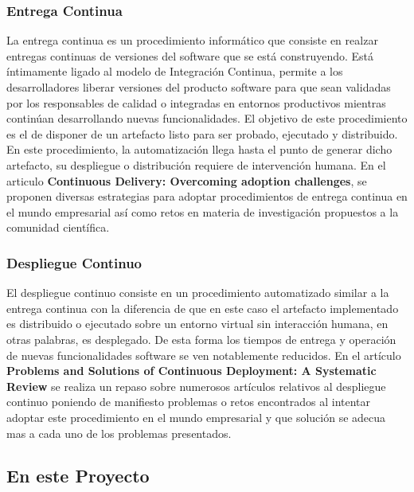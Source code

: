 \documentclass[a4paper,11pt]{book}
\begin{document}
\subsubsection{Entrega Continua}

La entrega continua es un procedimiento informático que consiste en realzar entregas continuas de versiones del software que se está construyendo. Está íntimamente ligado al modelo de Integración Continua, permite a los desarrolladores liberar versiones del producto software para que sean validadas por los responsables de calidad o integradas en entornos productivos mientras continúan desarrollando nuevas funcionalidades. El objetivo de este procedimiento es el de disponer de un artefacto listo para ser probado, ejecutado y distribuido.  En este procedimiento, la automatización llega hasta el punto de generar dicho artefacto, su despliegue o distribución requiere de intervención humana. En el articulo \textbf{Continuous Delivery: Overcoming adoption challenges}\cite{cd}, se proponen diversas estrategias para adoptar procedimientos de entrega continua  en el mundo empresarial así como retos en materia de investigación propuestos a la comunidad científica. 

\subsubsection{Despliegue Continuo}

El despliegue continuo consiste en un procedimiento automatizado similar a la entrega continua con la diferencia de que en este caso el artefacto implementado es distribuido o ejecutado sobre un entorno virtual sin interacción humana, en otras palabras, es desplegado.  De esta forma los tiempos de entrega y operación de nuevas funcionalidades software se ven notablemente reducidos. En el artículo \textbf{Problems and Solutions of Continuous Deployment: A Systematic Review}\cite{cdpl} se realiza un repaso sobre numerosos artículos relativos al despliegue continuo  poniendo de manifiesto problemas o retos encontrados al intentar adoptar este procedimiento en el mundo empresarial y que  
solución se adecua mas a cada uno de los problemas presentados. 

\subsection{En este Proyecto}
\end{document}
